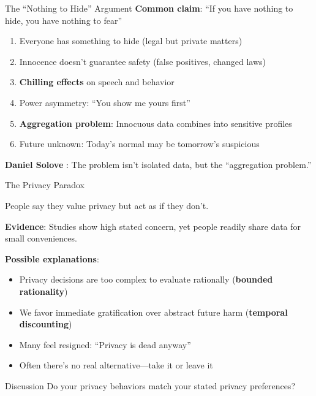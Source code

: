 ﻿\documentclass[aspectratio=169,11pt]{beamer}
\begin{document}
\begin{frame}{The ``Nothing to Hide'' Argument}
\textbf{Common claim}: ``If you have nothing to hide, you have nothing to fear''

\begin{objectionbox}
\small
\begin{enumerate}
    \item Everyone has something to hide (legal but private matters)
    \item Innocence doesn't guarantee safety (false positives, changed laws)
    \item \textbf{Chilling effects} on speech and behavior
    \item Power asymmetry: ``You show me yours first''
    \item \textbf{Aggregation problem}: Innocuous data combines into sensitive profiles
    \item Future unknown: Today's normal may be tomorrow's suspicious
\end{enumerate}
\end{objectionbox}

\vspace{0.2em}
\textbf{Daniel Solove} \parencite{solove_understanding_privacy}: The problem isn't isolated data, but the ``aggregation problem.''
\end{frame}

\begin{frame}{The Privacy Paradox}
\begin{conceptbox}
People say they value privacy but act as if they don't.
\end{conceptbox}

\vspace{0.2em}
\textbf{Evidence}: Studies show high stated concern, yet people readily share data for small conveniences.

\textbf{Possible explanations}:
\begin{itemize}
    \item Privacy decisions are too complex to evaluate rationally (\textbf{bounded rationality})
    \item We favor immediate gratification over abstract future harm (\textbf{temporal discounting})
    \item Many feel resigned: ``Privacy is dead anyway''
    \item Often there's no real alternative---take it or leave it
\end{itemize}

\begin{alertblock}{Discussion}
Do your privacy behaviors match your stated privacy preferences?
\end{alertblock}
\end{frame}
\end{document}
